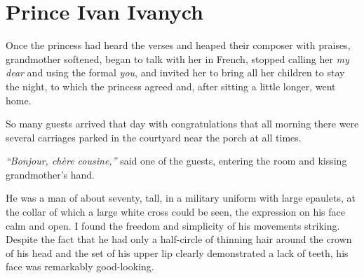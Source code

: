 \chapter{Prince Ivan Ivanych} %

Once the princess had heard the verses and heaped their composer with praises, grandmother softened, began to talk with her in French, stopped calling her \textit{my dear} and using the formal \textit{you}, and invited her to bring all her children to stay the night, to which the princess agreed and, after sitting a little longer, went home.

So many guests arrived that day with congratulations that all morning there were several carriages parked in the courtyard near the porch at all times.

\textit{``Bonjour, ch\`ere cousine,''} said one of the guests, entering the room and kissing grandmother's hand. %

He was a man of about seventy, tall, in a military uniform with large epaulets, at the collar of which a large white cross could be seen, the expression on his face calm and open. I found the freedom and simplicity of his movements striking. Despite the fact that he had only a half-circle of thinning hair around the crown of his head and the set of his upper lip clearly demonstrated a lack of teeth, his face was remarkably good-looking.

